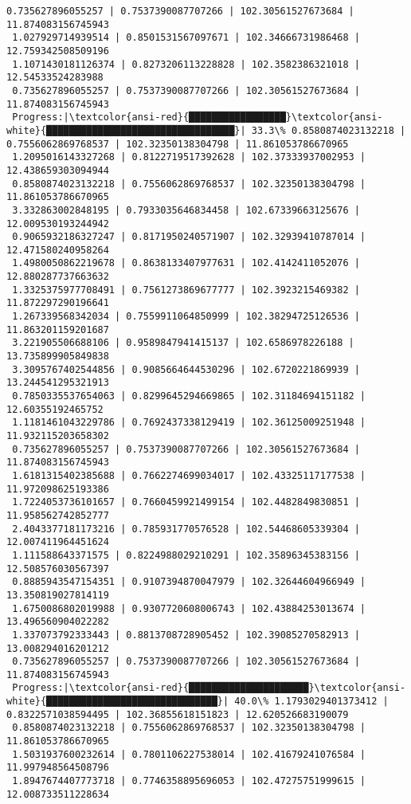 \documentclass[11pt]{article}
\begin{document}
\begin{Verbatim}[commandchars=\\\{\}]
 0.735627896055257 | 0.7537390087707266 | 102.30561527673684 | 11.874083156745943
 1.027929714939514 | 0.8501531567097671 | 102.34666731986468 | 12.759342508509196
 1.1071430181126374 | 0.8273206113228828 | 102.3582386321018 | 12.54533524283988
 0.735627896055257 | 0.7537390087707266 | 102.30561527673684 | 11.874083156745943
 Progress:|\textcolor{ansi-red}{█████████████████}\textcolor{ansi-white}{█████████████████████████████████}| 33.3\% 0.8580874023132218 | 0.7556062869768537 | 102.32350138304798 | 11.861053786670965
 1.2095016143327268 | 0.8122719517392628 | 102.37333937002953 | 12.438659303094944
 0.8580874023132218 | 0.7556062869768537 | 102.32350138304798 | 11.861053786670965
 3.332863002848195 | 0.7933035646834458 | 102.67339663125676 | 12.009530193244942
 0.9065932186327247 | 0.8171950240571907 | 102.32939410787014 | 12.471580240958264
 1.4980050862219678 | 0.8638133407977631 | 102.4142411052076 | 12.880287737663632
 1.3325375977708491 | 0.7561273869677777 | 102.3923215469382 | 11.872297290196641
 1.267339568342034 | 0.7559911064850999 | 102.38294725126536 | 11.863201159201687
 3.221905506688106 | 0.9589847941415137 | 102.6586978226188 | 13.735899905849838
 3.3095767402544856 | 0.9085664644530296 | 102.6720221869939 | 13.244541295321913
 0.7850335537654063 | 0.8299645294669865 | 102.31184694151182 | 12.60355192465752
 1.1181461043229786 | 0.7692437338129419 | 102.36125009251948 | 11.932115203658302
 0.735627896055257 | 0.7537390087707266 | 102.30561527673684 | 11.874083156745943
 1.6181315402385688 | 0.7662274699034017 | 102.43325117177538 | 11.972098625193386
 1.7224053736101657 | 0.7660459921499154 | 102.4482849830851 | 11.958562742852777
 2.4043377181173216 | 0.785931770576528 | 102.54468605339304 | 12.007411964451624
 1.111588643371575 | 0.8224988029210291 | 102.35896345383156 | 12.508576030567397
 0.8885943547154351 | 0.9107394870047979 | 102.32644604966949 | 13.350819027814119
 1.6750086802019988 | 0.9307720608006743 | 102.43884253013674 | 13.496560904022282
 1.337073792333443 | 0.8813708728905452 | 102.39085270582913 | 13.008294016201212
 0.735627896055257 | 0.7537390087707266 | 102.30561527673684 | 11.874083156745943
 Progress:|\textcolor{ansi-red}{█████████████████████}\textcolor{ansi-white}{██████████████████████████████}| 40.0\% 1.1793029401373412 | 0.8322571038594495 | 102.36855618151823 | 12.620526683190079
 0.8580874023132218 | 0.7556062869768537 | 102.32350138304798 | 11.861053786670965
 1.5031937600232614 | 0.7801106227538014 | 102.41679241076584 | 11.997948564508796
 1.8947674407773718 | 0.7746358895696053 | 102.47275751999615 | 12.008733511228634

\end{Verbatim}
\end{document}
